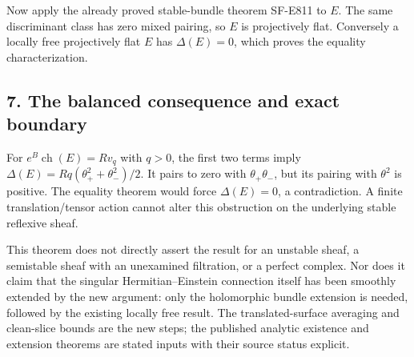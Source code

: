 Now apply the already proved stable-bundle theorem SF-E811 to \(E\). The
same discriminant class has zero mixed pairing, so \(E\) is projectively
flat. Conversely a locally free projectively flat \(E\) has \(\Delta(E)=0\),
which proves the equality characterization.

\subsection{7. The balanced consequence and exact
boundary}\label{SF-E834:the-balanced-consequence-and-exact-boundary}

For \(e^B\operatorname{ch}(E)=Rv_q\) with \(q>0\), the first two terms imply
\(\Delta(E)=Rq(\theta_+^2+\theta_-^2)/2\). It pairs to zero with
\(\theta_+\theta_-\), but its pairing with \(\theta^2\) is positive. The equality
theorem would force \(\Delta(E)=0\), a contradiction. A finite
translation/tensor action cannot alter this obstruction on the
underlying stable reflexive sheaf.

This theorem does not directly assert the result for an unstable sheaf,
a semistable sheaf with an unexamined filtration, or a perfect complex.
Nor does it claim that the singular Hermitian--Einstein connection
itself has been smoothly extended by the new argument: only the
holomorphic bundle extension is needed, followed by the existing locally
free result. The translated-surface averaging and clean-slice bounds are
the new steps; the published analytic existence and extension theorems
are stated inputs with their source status explicit.

